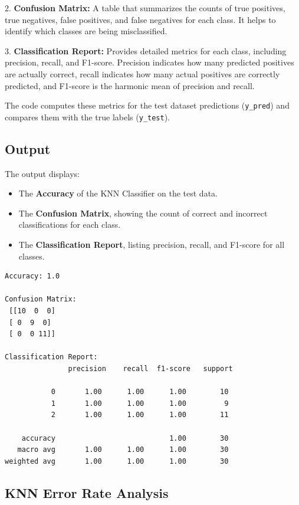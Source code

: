 \documentclass[11pt]{article}
\begin{document}
2. \textbf{Confusion Matrix:} A table that summarizes the counts of true positives, true negatives, false positives, and false negatives for each class. It helps to identify which classes are being misclassified.

3. \textbf{Classification Report:} Provides detailed metrics for each class, including precision, recall, and F1-score. Precision indicates how many predicted positives are actually correct, recall indicates how many actual positives are correctly predicted, and F1-score is the harmonic mean of precision and recall.

The code computes these metrics for the test dataset predictions (\texttt{y\_pred}) and compares them with the true labels (\texttt{y\_test}).

\subsection*{Output}
The output displays:

\begin{itemize}
  \item The \textbf{Accuracy} of the KNN Classifier on the test data.
  \item The \textbf{Confusion Matrix}, showing the count of correct and incorrect classifications for each class.
  \item The \textbf{Classification Report}, listing precision, recall, and F1-score for all classes.
\end{itemize}
    \begin{Verbatim}[commandchars=\\\{\}]
Accuracy: 1.0

Confusion Matrix:
 [[10  0  0]
 [ 0  9  0]
 [ 0  0 11]]

Classification Report:
               precision    recall  f1-score   support

           0       1.00      1.00      1.00        10
           1       1.00      1.00      1.00         9
           2       1.00      1.00      1.00        11

    accuracy                           1.00        30
   macro avg       1.00      1.00      1.00        30
weighted avg       1.00      1.00      1.00        30

    \end{Verbatim}


\subsection{KNN Error Rate Analysis}
\end{document}
